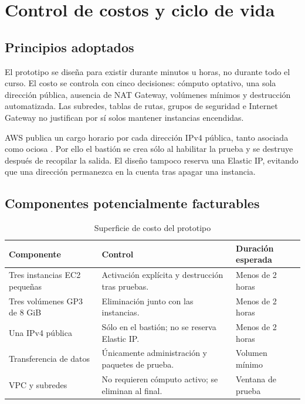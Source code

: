 \chapter{Control de costos y ciclo de vida}

\section{Principios adoptados}

El prototipo se diseña para existir durante minutos u horas, no durante todo el curso. El costo se controla con cinco decisiones: cómputo optativo, una sola dirección pública, ausencia de NAT Gateway, volúmenes mínimos y destrucción automatizada. Las subredes, tablas de rutas, grupos de seguridad e Internet Gateway no justifican por sí solos mantener instancias encendidas.

AWS publica un cargo horario por cada dirección IPv4 pública, tanto asociada como ociosa \cite{aws-vpc-pricing}. Por ello el bastión se crea sólo al habilitar la prueba y se destruye después de recopilar la salida. El diseño tampoco reserva una Elastic IP, evitando que una dirección permanezca en la cuenta tras apagar una instancia.

\section{Componentes potencialmente facturables}

\begin{table}[H]
\centering
\caption{Superficie de costo del prototipo}
\begin{tabularx}{\textwidth}{p{4.0cm}Y p{3.0cm}}
\toprule
\textbf{Componente} & \textbf{Control} & \textbf{Duración esperada} \\
\midrule
Tres instancias EC2 pequeñas & Activación explícita y destrucción tras pruebas. & Menos de 2 horas \\
Tres volúmenes GP3 de 8 GiB & Eliminación junto con las instancias. & Menos de 2 horas \\
Una IPv4 pública & Sólo en el bastión; no se reserva Elastic IP. & Menos de 2 horas \\
Transferencia de datos & Únicamente administración y paquetes de prueba. & Volumen mínimo \\
VPC y subredes & No requieren cómputo activo; se eliminan al final. & Ventana de prueba \\
\bottomrule
\end{tabularx}
\end{table}

